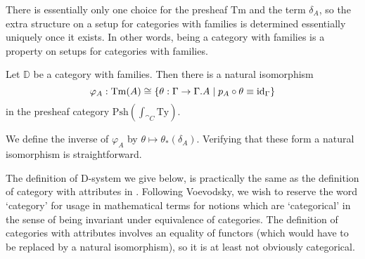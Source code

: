 There is essentially only one choice for the presheaf $\mathrm{Tm}$ and the
term $\delta_A$, so the extra structure on a setup for categories with families
is determined essentially uniquely once it exists. In other words, being a
category with families is a property on setups for categories with families.

\begin{defn}\label{lem:cwf_to_dsys}
Let $\mathbb{D}$ be a category with families. Then there is a natural isomorphism
\begin{equation*}
\varphi_A:\mathrm{Tm}(A)\cong\{\theta:\Gamma\to\ctxext{\Gamma}{A}\mid p_A\circ\theta\jdeq\catid{\Gamma}\}
\end{equation*}
in the presheaf category $\mathrm{Psh}(\int_{\cat{C}}\mathrm{Ty})$. 
\begin{comment}
The
natural isomorphism $\varphi$ is such that the term $\delta_A\in\mathrm{Tm}((p_A)_\ast(A))$
corresponds to the unique arrow $\tilde{q}_A$ which fits in the diagram
\begin{equation*}
\begin{tikzcd}
\ctxext{\Gamma}{A} \arrow[ddr,bend right=15,equals] \arrow[drr,bend left=15,equals] \arrow[dr,"{\tilde \delta_A}"] \\
& \ctxext{{\Gamma}{A}}{(p_A)_\ast(A)} \arrow[d,fib] & \ctxext{\Gamma}{A} \arrow[d,fib] \\
& \ctxext{\Gamma}{A} \arrow[r,"{p_A}"] & \Gamma
\end{tikzcd}
\end{equation*}
\end{comment}
\end{defn}

\begin{constr}
We define the inverse of $\varphi_A$ by $\theta\mapsto\theta_\ast(\delta_A)$. Verifying
that these form a natural isomorphism is straightforward.
\end{constr}

The definition of D-system we give below, is practically the same as the definition
of category with attributes in \cite[Definition 3.10]{Hofmann_syntax_semantics}.
Following Voevodsky, we wish to reserve the word `category' for usage in mathematical terms
for notions which are `categorical' in the sense of being invariant under 
equivalence of categories. The definition of categories with attributes involves
an equality of functors (which would have to be replaced by a natural 
isomorphism), so it is at least not obviously categorical.

